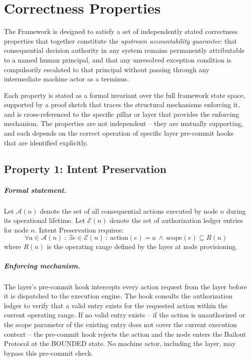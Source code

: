 \section{Correctness Properties}\label{sec:correctness}

The \bxthree{} Framework is designed to satisfy a set of independently stated
correctness properties that together constitute the \textit{upstream accountability
guarantee}: that consequential decision authority in any \bxthree{} system
remains permanently attributable to a named human principal, and that any
unresolved exception condition is compulsorily escalated to that principal
without passing through any intermediate machine actor as a terminus.

Each property is stated as a formal invariant over the full framework state space,
supported by a proof sketch that traces the structural mechanisms enforcing it,
and is cross-referenced to the specific pillar or layer that provides the
enforcing mechanism.  The properties are not independent -- they are mutually
supporting, and each depends on the correct operation of specific \fact{} layer
pre-commit hooks that are identified explicitly.

\subsection{Property 1: Intent Preservation}\label{sec:intent-preservation}


\subparagraph{Formal statement.}  Let $\mathcal{A}(n)$ denote the set of all consequential actions executed by node $n$ during its operational lifetime.  Let $\mathcal{E}(n)$ denote the set of authorization ledger entries for node $n$.  Intent Preservation requires:
\[
\forall a \in \mathcal{A}(n)\ :\ \exists e \in \mathcal{E}(n)\ :\ \text{action}(e) = a
\ \land\ \text{scope}(e) \subseteq R(n)
\]
where $R(n)$ is the operating range defined by the \purpose{} layer at node provisioning.

\subparagraph{Enforcing mechanism.}  The \fact{} layer's pre-commit hook
intercepts every action request from the \bounds{} layer before it is dispatched
to the execution engine.  The hook consults the authorization ledger to verify
that a valid entry exists for the requested action within the current operating
range.  If no valid entry exists -- if the action is unauthorized or the scope
parameter of the existing entry does not cover the current execution context --
the pre-commit hook rejects the action and the node enters the Bailout Protocol
at the BOUNDED state.  No machine actor, including the \bounds{} layer, may
bypass this pre-commit check.

